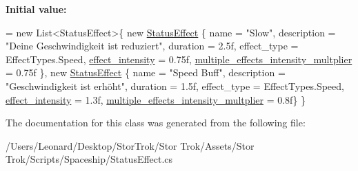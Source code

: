 {\bfseries Initial value\+:}
\begin{DoxyCode}
= \textcolor{keyword}{new} List<StatusEffect>\{
        \textcolor{keyword}{new} \hyperlink{class_status_effect}{StatusEffect} \{ name = \textcolor{stringliteral}{"Slow"}, description = \textcolor{stringliteral}{"Deine Geschwindigkeit ist reduziert"}, 
      duration = 2.5f, effect\_type = EffectTypes.Speed, \hyperlink{class_status_effect_a8440863026d4e9275ab2c701ddef7938}{effect\_intensity} = 0.75f, 
      \hyperlink{class_status_effect_a3504e8fd0ecb620a2678f5cce8660d44}{multiple\_effects\_intensity\_multplier} = 0.75f \},
        \textcolor{keyword}{new} \hyperlink{class_status_effect}{StatusEffect} \{ name = \textcolor{stringliteral}{"Speed Buff"}, description = \textcolor{stringliteral}{"Geschwindigkeit ist erhöht"}, 
      duration = 1.5f, effect\_type = EffectTypes.Speed, \hyperlink{class_status_effect_a8440863026d4e9275ab2c701ddef7938}{effect\_intensity} = 1.3f, 
      \hyperlink{class_status_effect_a3504e8fd0ecb620a2678f5cce8660d44}{multiple\_effects\_intensity\_multplier} = 0.8f\}
    \}
\end{DoxyCode}


The documentation for this class was generated from the following file\+:\begin{DoxyCompactItemize}
\item 
/\+Users/\+Leonard/\+Desktop/\+Stor\+Trok/\+Stor Trok/\+Assets/\+Stor Trok/\+Scripts/\+Spaceship/Status\+Effect.\+cs\end{DoxyCompactItemize}
